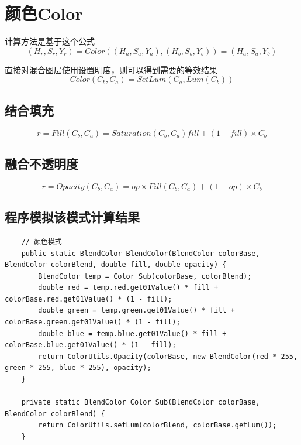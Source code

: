 %
%

\newpage
\section{ 颜色Color}
计算方法是基于这个公式
\begin{equation}(H_r,S_r,Y_r)= Color((H_a,S_a,Y_a),(H_b,S_b,Y_b))=(H_a,S_a,Y_b)\end{equation}

直接对混合图层使用设置明度，则可以得到需要的等效结果
\begin{equation}Color(C_b,C_a)=SetLum(C_a,Lum(C_b))\end{equation}

\subsection{ 结合填充}

\begin{equation}r=Fill(C_b,C_a)= Saturation(C_b,C_a) fill + (1-fill)\times C_b\end{equation}

\subsection{ 融合不透明度}

\begin{equation}r=Opacity(C_b,C_a)=op\times Fill(C_b,C_a)+(1-op)\times C_b\end{equation}

\subsection{ 程序模拟该模式计算结果}

\begin{lstlisting}
	// 颜色模式
	public static BlendColor BlendColor(BlendColor colorBase, BlendColor colorBlend, double fill, double opacity) {
		BlendColor temp = Color_Sub(colorBase, colorBlend);
		double red = temp.red.get01Value() * fill + colorBase.red.get01Value() * (1 - fill);
		double green = temp.green.get01Value() * fill + colorBase.green.get01Value() * (1 - fill);
		double blue = temp.blue.get01Value() * fill + colorBase.blue.get01Value() * (1 - fill);
		return ColorUtils.Opacity(colorBase, new BlendColor(red * 255, green * 255, blue * 255), opacity);
	}
	
	private static BlendColor Color_Sub(BlendColor colorBase, BlendColor colorBlend) {
		return ColorUtils.setLum(colorBlend, colorBase.getLum());
	}
\end{lstlisting}



